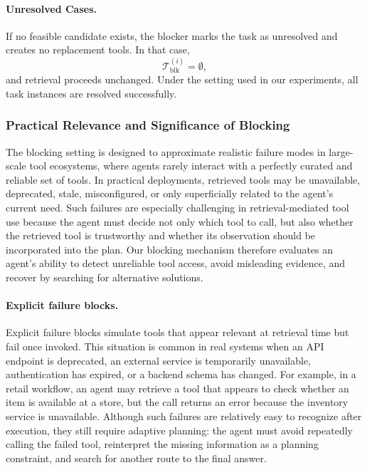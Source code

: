 \paragraph{Unresolved Cases.}
If no feasible candidate exists, the blocker marks the task as unresolved and creates no replacement tools.
In that case,
\begin{equation}
\mathcal{T}^{(i)}_{\mathrm{blk}}=\emptyset,
\end{equation}
and retrieval proceeds unchanged.
Under the setting used in our experiments, all task instances are resolved successfully.




\subsubsection{Practical Relevance and Significance of Blocking}
\label{app:blocker-significance}

The blocking setting is designed to approximate realistic failure modes in large-scale tool ecosystems, where agents rarely interact with a perfectly curated and reliable set of tools. In practical deployments, retrieved tools may be unavailable, deprecated, stale, misconfigured, or only superficially related to the agent's current need. Such failures are especially challenging in retrieval-mediated tool use because the agent must decide not only which tool to call, but also whether the retrieved tool is trustworthy and whether its observation should be incorporated into the plan. Our blocking mechanism therefore evaluates an agent's ability to detect unreliable tool access, avoid misleading evidence, and recover by searching for alternative solutions.

\paragraph{Explicit failure blocks.}
Explicit failure blocks simulate tools that appear relevant at retrieval time but fail once invoked.
This situation is common in real systems when an API endpoint is deprecated, an external service is temporarily unavailable, authentication has expired, or a backend schema has changed. 
For example, in a retail workflow, an agent may retrieve a tool that appears to check whether an item is available at a store, but the call returns an error because the inventory service is unavailable. 
Although such failures are relatively easy to recognize after execution, they still require adaptive planning: the agent must avoid repeatedly calling the failed tool, reinterpret the missing information as a planning constraint, and search for another route to the final answer.

